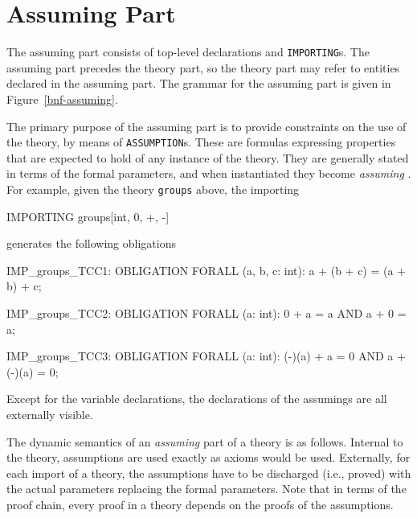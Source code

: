 \section{Assuming Part}\label{assuming}

The assuming part consists of top-level declarations and
\texttt{IMPORTING}s.  The assuming part precedes the theory part, so the
theory part may refer to entities declared in the assuming part.  The
grammar for the assuming part is given in Figure~\ref{bnf-assuming}.

The primary purpose of the assuming part is to provide constraints on the
use of the theory, by means of \texttt{ASSUMPTION}s.  These are formulas
expressing properties that are expected to hold of any instance of the
theory.  They are generally stated in terms of the formal parameters, and
when instantiated they become \emph{assuming} \tccs. For example, given the theory \texttt{groups}
above, the importing
\begin{pvsex}
  IMPORTING groups[int, 0, +, -]
\end{pvsex}
generates the following obligations
\begin{pvsex}
  IMP_groups_TCC1: OBLIGATION FORALL (a, b, c: int): a + (b + c) = (a + b) + c;

  IMP_groups_TCC2: OBLIGATION FORALL (a: int): 0 + a = a AND a + 0 = a;

  IMP_groups_TCC3: OBLIGATION FORALL (a: int): (-)(a) + a = 0 AND a + (-)(a) = 0;
\end{pvsex}

Except for the variable declarations, the declarations of the assumings
are all externally visible.  
  
The dynamic semantics of an \emph{assuming} part of a theory is as
follows.  Internal to the theory, assumptions are used exactly as axioms
would be used.  Externally, for each import of a theory, the assumptions
have to be discharged (i.e., proved) with the actual parameters replacing
the formal parameters.  Note that in terms of the proof chain, every proof
in a theory depends on the proofs of the assumptions.

